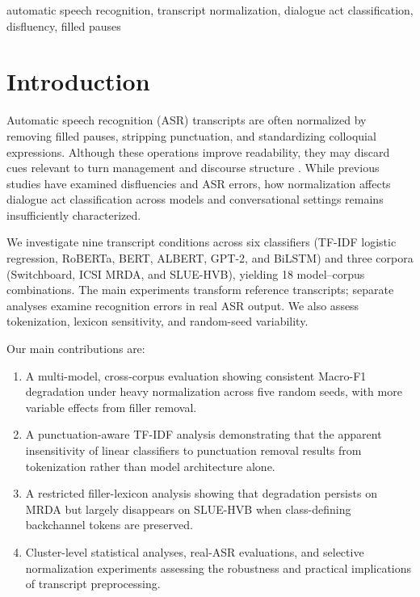 \documentclass[conference]{IEEEtran}
\begin{document}
\begin{IEEEkeywords}
automatic speech recognition, transcript normalization,
dialogue act classification, disfluency, filled pauses
\end{IEEEkeywords}

\section{Introduction}

Automatic speech recognition (ASR) transcripts are
often normalized by removing filled pauses, stripping
punctuation, and standardizing colloquial expressions.
Although these operations improve readability, they
may discard cues relevant to turn management and
discourse structure
\cite{CLARK200273,
https://doi.org/10.1111/j.1749-818X.2008.00068.x,
CLARK1989259}. While previous studies have examined
disfluencies and ASR errors, how normalization affects
dialogue act classification across models and
conversational settings remains insufficiently
characterized.

We investigate nine transcript conditions across
six classifiers (TF-IDF logistic regression, RoBERTa,
BERT, ALBERT, GPT-2, and BiLSTM) and three corpora
(Switchboard, ICSI MRDA, and SLUE-HVB), yielding
18 model--corpus combinations. The main experiments
transform reference transcripts; separate analyses
examine recognition errors in real ASR output.
We also assess tokenization, lexicon sensitivity,
and random-seed variability.

Our main contributions are:
\begin{enumerate}
    \item A multi-model, cross-corpus evaluation
    showing consistent Macro-F1 degradation under
    heavy normalization across five random seeds,
    with more variable effects from filler removal.

    \item A punctuation-aware TF-IDF analysis
    demonstrating that the apparent insensitivity
    of linear classifiers to punctuation removal
    results from tokenization rather than model
    architecture alone.

    \item A restricted filler-lexicon analysis
    showing that degradation persists on MRDA
    but largely disappears on SLUE-HVB when
    class-defining backchannel tokens are preserved.

    \item Cluster-level statistical analyses,
    real-ASR evaluations, and selective
    normalization experiments assessing the
    robustness and practical implications
    of transcript preprocessing.
\end{enumerate}
\end{document}
